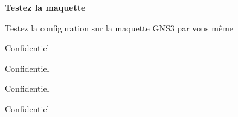\newcommand{\password}{Confidentiel}
\newcommand{\user}{Confidentiel}
\newcommand{\host}{Confidentiel}
\newcommand{\port}{Confidentiel}

\begin{center}
  \colorbox{PineGreen}{\begin{minipage}{10cm}
    \bigskip
    \sffamily
    \color{white}
    \hspace{5mm}\textbf{\Large Testez la maquette}\hspace{5mm}\par
    \medskip
    \hspace{5mm}\noindent Testez la configuration sur la maquette GNS3 par vous même\hspace{5mm}\par
    \hspace{5mm}\begin{description}
      \sffamily
      \item[\sffamily Hôte] \host
      \item[\sffamily Port] \port
      \item[\sffamily Utilisateur] \user
      \item[\sffamily Mot de passe] \password
    \end{description}\hspace{5mm}
  \medskip
  \end{minipage}}
\end{center}